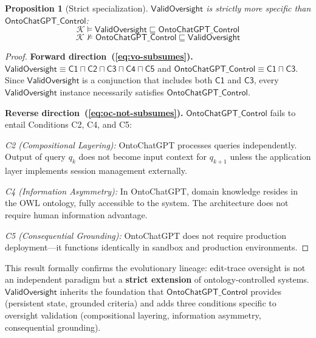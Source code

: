 \documentclass[11pt]{article}
\newtheorem{proposition}{Proposition}[section]
\newcommand{\KB}{\ensuremath{\mathcal{K}}\xspace}
\newcommand{\sqsub}{\sqsubseteq}
\begin{document}
\begin{proposition}[Strict specialization]
\label{prop:non-subsumption}
$\mathsf{ValidOversight}$ is strictly more specific than $\mathsf{OntoChatGPT\_Control}$:
\begin{equation}
  \KB \models \mathsf{ValidOversight} \sqsub \mathsf{OntoChatGPT\_Control}
  \label{eq:vo-subsumes}
\end{equation}
\begin{equation}
  \KB \not\models \mathsf{OntoChatGPT\_Control} \sqsub \mathsf{ValidOversight}
  \label{eq:oc-not-subsumes}
\end{equation}
\end{proposition}

\begin{proof}
\textbf{Forward direction~(\ref{eq:vo-subsumes}).}
$\mathsf{ValidOversight} \equiv \mathsf{C1} \sqcap \mathsf{C2} \sqcap \mathsf{C3} \sqcap \mathsf{C4} \sqcap \mathsf{C5}$ and $\mathsf{OntoChatGPT\_Control} \equiv \mathsf{C1} \sqcap \mathsf{C3}$.
Since $\mathsf{ValidOversight}$ is a conjunction that includes both $\mathsf{C1}$ and $\mathsf{C3}$, every $\mathsf{ValidOversight}$ instance necessarily satisfies $\mathsf{OntoChatGPT\_Control}$.

\textbf{Reverse direction~(\ref{eq:oc-not-subsumes}).}
$\mathsf{OntoChatGPT\_Control}$ fails to entail Conditions C2, C4, and C5:

\emph{C2 (Compositional Layering):}
OntoChatGPT processes queries independently.
Output of query $q_k$ does not become input context for $q_{k+1}$ unless the application layer implements session management externally.

\emph{C4 (Information Asymmetry):}
In OntoChatGPT, domain knowledge resides in the OWL ontology, fully accessible to the system.
The architecture does not require human information advantage.

\emph{C5 (Consequential Grounding):}
OntoChatGPT does not require production deployment---it functions identically in sandbox and production environments.
\end{proof}

This result formally confirms the evolutionary lineage: edit-trace oversight is not an independent paradigm but a \textbf{strict extension} of ontology-controlled systems.
$\mathsf{ValidOversight}$ inherits the foundation that $\mathsf{OntoChatGPT\_Control}$ provides (persistent state, grounded criteria) and adds three conditions specific to oversight validation (compositional layering, information asymmetry, consequential grounding).
\end{document}
